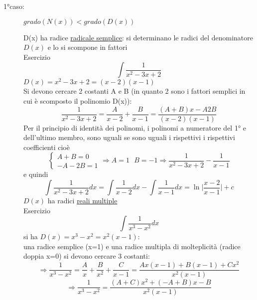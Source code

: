 \begin{description}
	\item[1°caso:] $grado(N(x))<grado(D(x))$
		\begin{tasks}
			\task D(x) ha radice \underline{radicale semplice}: si determinano le radici del denominatore $D(x)$ e lo si scompone in fattori\\
			Esercizio
			\begin{equation}
				\int\frac{1}{x^2-3x+2}
			\end{equation}
			$D(x)=x^2-3x+2=(x-2)(x-1)$\\
			Si devono cercare 2 costanti A e B (in quanto 2 sono i fattori semplici in cui è scomposto il polinomio D(x)):
			\begin{equation*}
				\frac{1}{x^2-3x+2}=\frac{A}{x-2}+\frac{B}{x-1}=\frac{(A+B)x-A2B}{(x-2)(x-1)}
			\end{equation*}
			Per il principio di identità dei polinomi, i polinomi a numeratore del 1° e dell'ultimo membro, sono uguali se sono uguali i rispettivi i rispettivi coefficienti cioè
			\begin{equation*}
				\begin{cases}
					A+B=0\\
					-A-2B=1
				\end{cases}\Rightarrow A=1\text{ }B=-1\Rightarrow \frac{1}{x^2-3x+2}-\frac{1}{x-1}
			\end{equation*}
			e quindi
			\begin{equation*}
				\int\frac{1}{x^2-3x+2}dx=\int\frac{1}{x-2}dx-\int \frac{1}{x-1}dx=\ln \bigg|\frac{x-2}{x-1}\bigg|+c
			\end{equation*}
			\task $D(x)$ ha radici \underline{reali multiple}\\
			Esercizio
			\begin{equation*}
				\int \frac{1}{x^3-x^2}dx
			\end{equation*}
			si ha $D(x)=x^3-x^2=x^2(x-1)$:\\
			una radice semplice (x=1) e una radice multipla di molteplicità (radice doppia x=0) si devono cercare 3 costanti:
			\begin{equation*}
				\Rightarrow \frac{1}{x^3-x^2}=\frac{A}{x}+\frac{B}{x^2}+\frac{C}{x-1}=\frac{Ax(x-1)+B(x-1)+Cx^2}{x^2(x-1)}
			\end{equation*}
			\begin{equation*}
				\Rightarrow \frac{1}{x^3-x^2}=\frac{(A+C)x^2+(-A+B)x-B}{x^2(x-1)}
			\end{equation*}
			\begin{equation*}

\end{equation*}
\end{tasks}
\end{description}
